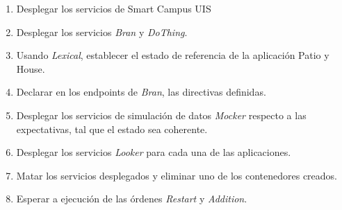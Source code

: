\begin{enumerate}[itemsep=0mm]
    \item Desplegar los servicios de Smart Campus UIS
    \item Desplegar los servicios \textit{Bran} y \textit{DoThing}.
    \item Usando \textit{Lexical}, establecer el estado de referencia de la aplicación Patio y House. 
    \item Declarar en los endpoints de \textit{Bran}, las directivas definidas.
    \item Desplegar los servicios de simulación de datos \textit{Mocker} respecto a las expectativas, tal que el estado sea coherente.
    \item Desplegar los servicios \textit{Looker} para cada una de las aplicaciones.
    \item Matar los servicios desplegados y eliminar uno de los contenedores creados.
    \item Esperar a ejecución de las órdenes \textit{Restart} y \textit{Addition}.
\end{enumerate}